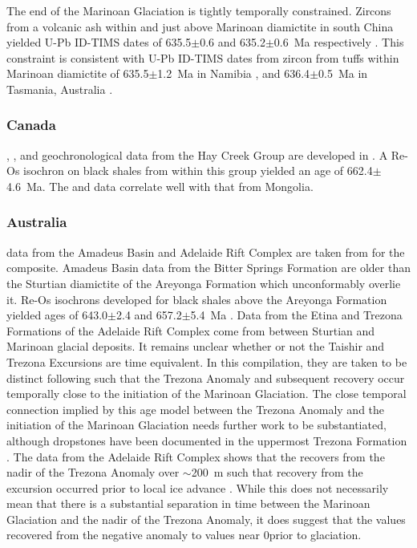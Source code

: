 The end of the Marinoan Glaciation is tightly temporally constrained. Zircons from a volcanic ash within and just above Marinoan diamictite in south China yielded U-Pb ID-TIMS dates of 635.5$\pm$0.6 and 635.2$\pm$0.6~Ma respectively \citep{Condon2005a}. This constraint is consistent with U-Pb ID-TIMS dates from zircon from tuffs within Marinoan diamictite of 635.5$\pm$1.2~Ma in Namibia \citep{Hoffmann2004a}, and 636.4$\pm$0.5~Ma in Tasmania, Australia \citep{Calver2013a}.

\subsubsection{Canada}

\dC, \SrSr, and geochronological data from the Hay Creek Group are developed in \citet{Rooney2014a}. A Re-Os isochron on black shales from within this group yielded an age of 662.4$\pm$4.6~Ma. The \dC and \SrSr data correlate well with that from Mongolia.

\subsubsection{Australia}

\dC data from the Amadeus Basin and Adelaide Rift Complex are taken from \citet{Swanson-Hysell2010a} for the composite. Amadeus Basin data from the Bitter Springs Formation are older than the Sturtian diamictite of the Areyonga Formation which unconformably overlie it. Re-Os isochrons developed for black shales above the Areyonga Formation yielded ages of 643.0$\pm$2.4 and 657.2$\pm$5.4~Ma \citep{Kendall2006a}. Data from the Etina and Trezona Formations of the Adelaide Rift Complex come from between Sturtian and Marinoan glacial deposits. It remains unclear whether or not the Taishir and Trezona Excursions are time equivalent. In this compilation, they are taken to be distinct following \citet{Bold2016a} such that the Trezona Anomaly and subsequent recovery occur temporally close to the initiation of the Marinoan Glaciation. The close temporal connection implied by this age model between the Trezona Anomaly and the initiation of the Marinoan Glaciation needs further work to be substantiated, although dropstones have been documented in the uppermost Trezona Formation \citep{Rose2012a}. The data from the Adelaide Rift Complex shows that the \dC recovers from the nadir of the Trezona Anomaly over $\sim$200~m such that recovery from the excursion occurred prior to local ice advance \citep{Rose2012a}. While this does not necessarily mean that there is a substantial separation in time between the Marinoan Glaciation and the nadir of the Trezona Anomaly, it does suggest that the \dC values recovered from the negative anomaly to values near 0\permil prior to glaciation.

